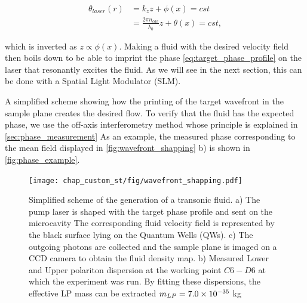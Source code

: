 \begin{equation}
    \begin{align}
    \theta_{laser}(r)&=k_zz+\phi(x)=cst \\
                      &=\frac{2\pi n_{cav} }{\lambda_0}z+\theta(x)= cst,
    \end{align}
\end{equation}

which is inverted as $z\propto \phi(x)$. Making a fluid with the desired velocity field then boils down to be able to imprint the phase \autoref{eq:target_phase_profile} on the laser that resonantly excites the fluid. As we will see in the next section, this can be done with a Spatial Light Modulator (SLM). 

 A simplified scheme showing how the printing of the target wavefront in the sample plane creates the desired flow.
To verify that the fluid has the expected phase, we use the off-axis interferometry method whose principle is explained in \autoref{sec:phase_measurement}
As an example, the measured phase corresponding to the mean field displayed in \autoref{fig:wavefront_shapping} b) is shown in \autoref{fig:phase_example}.
 
\begin{figure}
    \centering
    \texttt{[image: chap\_custom\_st/fig/wavefront\_shapping.pdf]}
    \caption{Simplified scheme of the generation of a transonic fluid. a) The pump laser is shaped with the target phase profile and sent on the microcavity The corresponding fluid velocity field is represented by the black surface lying on the Quantum Wells (QWs). c) The outgoing photons are collected and the sample 
    plane is imaged on a CCD camera to obtain the fluid density map.  b) Measured Lower and Upper polariton dispersion at the working point $C6-D6$ at which the experiment was run. By fitting these dispersions,
    the effective LP mass can be extracted $m_{LP}= 7.0 \times 10^{-35}$ kg}
    \label{fig:wavefront_shapping}
\end{figure}


\bigskip 


